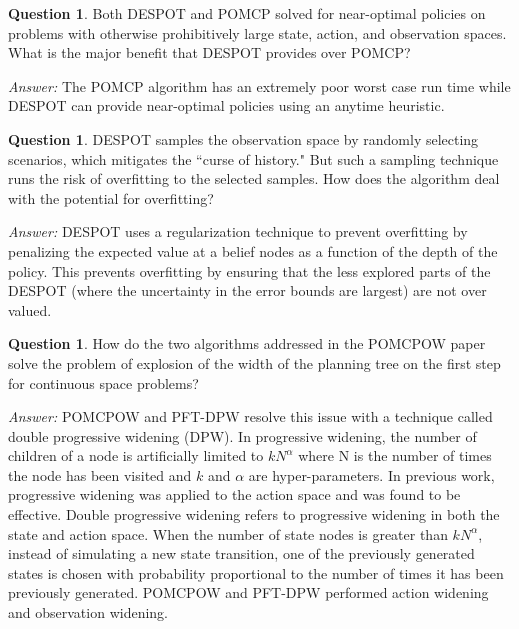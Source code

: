 \documentclass{article}
\theoremstyle{definition}
\newtheorem{question}[thm]{Question}
\newenvironment{answer}{\noindent\textit{Answer:}}{}
\begin{document}
\begin{question}
Both DESPOT and POMCP solved for near-optimal policies on problems with otherwise prohibitively large state, action, and observation spaces. What is the major benefit that DESPOT provides over POMCP?
\end{question}

\begin{answer}
The POMCP algorithm has an extremely poor worst case run time while DESPOT can provide near-optimal policies using an anytime heuristic. 
\end{answer}

\begin{question}
DESPOT samples the observation space by randomly selecting scenarios, which mitigates the ``curse of history." But such a sampling technique runs the risk of overfitting to the selected samples. How does the algorithm deal with the potential for overfitting? 
\end{question}

\begin{answer}
DESPOT uses a regularization technique to prevent overfitting by penalizing the expected value at a belief nodes as a function of the depth of the policy. This prevents overfitting by ensuring that the less explored parts of the DESPOT (where the uncertainty in the error bounds are largest) are not over valued. 
\end{answer}

\begin{question}
How do the two algorithms addressed in the POMCPOW paper solve the problem of explosion of the width of the planning tree on the first step for continuous space problems? 
\end{question}

\begin{answer}
POMCPOW and PFT-DPW resolve this issue with a technique called double progressive widening (DPW). In progressive widening, the number of children of a node is artificially limited to $kN^{\alpha}$ where N is the number of times the node has been visited and $k$ and $\alpha$ are hyper-parameters. In previous work, progressive widening was applied to the action space and was found to be effective. Double progressive widening refers to progressive widening in both the state and action space. When the number of state nodes is greater than $kN^{\alpha}$, instead of simulating a new state transition, one of the previously generated states is chosen with probability proportional to the number of times it has been previously generated. POMCPOW and PFT-DPW performed action widening and observation widening.
\end{answer}
\end{document}
